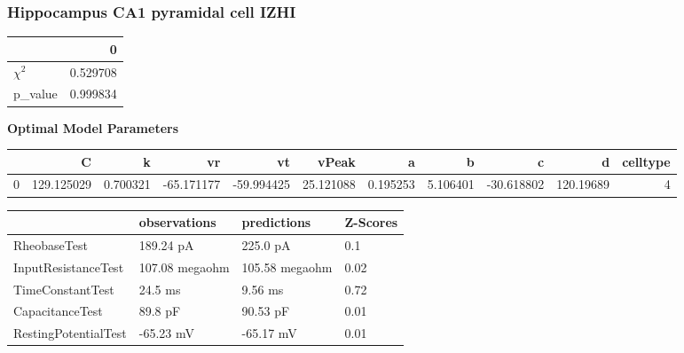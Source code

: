 \subsubsection{Hippocampus CA1 pyramidal cell IZHI}\begin{tabular}{lr}
\toprule
{} &         0 \\
\midrule
$\chi^{2}$ &  0.529708 \\
p\_value    &  0.999834 \\
\bottomrule
\end{tabular}
\textbf{Optimal Model Parameters} \begin{tabular}{lrrrrrrrrrr}
\toprule
{} &           C &         k &         vr &         vt &      vPeak &         a &         b &          c &          d &  celltype \\
\midrule
0 &  129.125029 &  0.700321 & -65.171177 & -59.994425 &  25.121088 &  0.195253 &  5.106401 & -30.618802 &  120.19689 &         4 \\
\bottomrule
\end{tabular}
\begin{tabular}{llll}
\toprule
{} &    observations &     predictions & Z-Scores \\
\midrule
RheobaseTest         &       189.24 pA &        225.0 pA &      0.1 \\
InputResistanceTest  &  107.08 megaohm &  105.58 megaohm &     0.02 \\
TimeConstantTest     &         24.5 ms &         9.56 ms &     0.72 \\
CapacitanceTest      &         89.8 pF &        90.53 pF &     0.01 \\
RestingPotentialTest &       -65.23 mV &       -65.17 mV &     0.01 \\
\bottomrule
\end{tabular}
